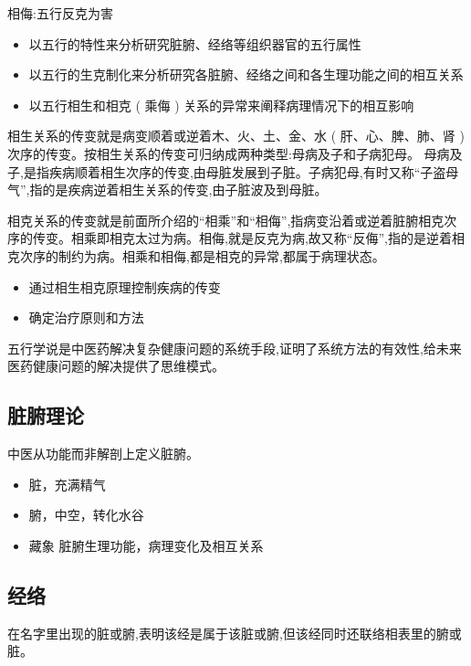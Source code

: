 \documentclass[
  letterpaper,
  DIV=11,
  numbers=noendperiod]{scrreprt}
\providecommand{\tightlist}{%
  \setlength{\itemsep}{0pt}\setlength{\parskip}{0pt}}\usepackage{longtable,booktabs,array}
\begin{document}
相侮:五行反克为害

\begin{itemize}
\item
  以五行的特性来分析研究脏腑、经络等组织器官的五行属性
\item
  以五行的生克制化来分析研究各脏腑、经络之间和各生理功能之间的相互关系
\item
  以五行相生和相克 ( 乘侮 ) 关系的异常来阐释病理情况下的相互影响
\end{itemize}

相生关系的传变就是病变顺着或逆着木、火、土、金、水 ( 肝、心、脾、肺、肾
) 次序的传变。按相生关系的传变可归纳成两种类型:母病及子和子病犯母。
母病及子,是指疾病顺着相生次序的传变,由母脏发展到子脏。子病犯母,有时又称``子盗母气'',指的是疾病逆着相生关系的传变,由子脏波及到母脏。

相克关系的传变就是前面所介绍的``相乘''和``相侮'',指病变沿着或逆着脏腑相克次序的传变。相乘即相克太过为病。相侮,就是反克为病,故又称``反侮'',指的是逆着相克次序的制约为病。相乘和相侮,都是相克的异常,都属于病理状态。

\begin{itemize}
\item
  通过相生相克原理控制疾病的传变
\item
  确定治疗原则和方法
\end{itemize}

五行学说是中医药解决复杂健康问题的系统手段,证明了系统方法的有效性,给未来医药健康问题的解决提供了思维模式。

\subsection{脏腑理论}\label{ux810fux8151ux7406ux8bba}

中医从功能而非解剖上定义脏腑。

\begin{itemize}
\tightlist
\item
  脏，充满精气
\item
  腑，中空，转化水谷
\item
  藏象 脏腑生理功能，病理变化及相互关系
\end{itemize}

\subsection{经络}\label{ux7ecfux7edc}

在名字里出现的脏或腑,表明该经是属于该脏或腑,但该经同时还联络相表里的腑或脏。
\end{document}

